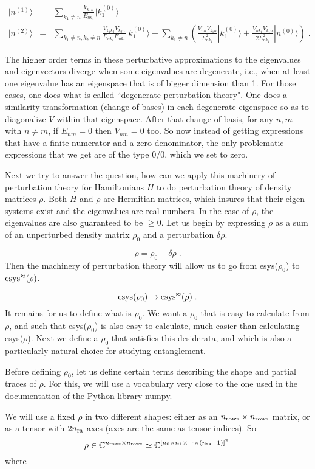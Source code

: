 \documentclass[12pt]{article}%
\newcommand{\ket}[1]{|#1\rangle}
\newcommand{\beq}{\begin{equation}}
\newcommand{\eeq}{\end{equation}}
\newcommand{\beqa}{\begin{eqnarray}}
\newcommand{\eeqa}{\end{eqnarray}}
\newcommand{\rarrow}[0]{\rightarrow}
\newcommand{\CC}[0]{{ \mathbb{C}} }
\newcommand{\nra}[0]{{n_{\rm ra}}}
\newcommand{\nr}[0]{{n_{\rm rows}}}
\begin{document}
\beqa
\ket{n^{(1)}} &=&
\sum_{k_1\neq n} \frac{V_{k_1n}}{E_{nk_1}}\ket{k^{(0)}_1}
\\
\ket{n^{(2)}}&=&
\sum_{k_1\neq n, k_2\neq n}
\frac{V_{k_1k_2}V_{k_2n}}{E_{nk_1}E_{nk_2}}\ket{k_1^{(0)}}
- \sum_{k_1\neq n}\left(
\frac{V_{nn}V_{k_1n}}{E^2_{nk_1}}\ket{k^{(0)}_1}
+ \frac{V_{nk_1}V_{k_1n}}{2E_{nk_1}^2}\ket{n^{(0)}}
\right)
\;.
\eeqa

The higher order terms in
these perturbative approximations
to the eigenvalues and eigenvectors
diverge
when  some eigenvalues are degenerate,
i.e., when at least one eigenvalue
has an eigenspace that is of bigger
dimension than 1. For those cases,
one does what is called
``degenerate perturbation theory".
One does a similarity transformation
(change of bases) in each degenerate
eigenspace so as to diagonalize $V$
within that eigenspace.
After that change of
basis, for any $n,m$ with $n\neq m$,
if $E_{nm}=0$ then $V_{nm}=0$ too.
So now instead of getting expressions
that have a finite numerator and a zero
denominator, the
only problematic expressions that we get are
of the type 0/0, which we set to zero.


Next we try to answer the question, how
can we apply this machinery of perturbation
theory for Hamiltonians  $H$ to do perturbation
theory of density matrices $\rho$.
Both $H$ and $\rho$ are Hermitian matrices,
which insures that
their eigen systems exist and the eigenvalues are real
numbers. In the case of $\rho$,
the eigenvalues are also guaranteed to be $\geq 0$.
Let us begin by expressing $\rho$
as a sum of an unperturbed density matrix $\rho_0$
and a perturbation $\delta \rho$.

\beq
\rho = \rho_0 + \delta \rho
\;.
\eeq
Then the machinery of perturbation
theory will allow us to go from
esys($\rho_0$) to ${\rm esys^\approx(\rho)}$.

\beq
{\rm esys}(\rho_0) \rarrow {\rm esys^\approx(\rho)}
\;.
\eeq
It remains for us to define what is $\rho_0$.
We want a $\rho_0$ that
is easy to calculate
from $\rho$,
and such that esys($\rho_0$) is also easy to
calculate, much easier
than calculating esys($\rho$).
Next we define
a $\rho_0$ that satisfies this desiderata, and
which is also a particularly natural
choice for studying entanglement.

Before defining $\rho_0$, let us
define certain terms describing
the shape and partial traces of $\rho$.
For this, we will use a vocabulary
very close to the one used in the
documentation of the Python library numpy.

We will use a fixed $\rho$ in two different shapes:
either as an $\nr\times\nr$ matrix,
or as a tensor with $2\nra$ axes (axes are the same as
tensor indices). So
\beq
\rho \in \CC^{\nr\times\nr}
\simeq \CC^{[n_0\times n_1 \times\cdots\times(\nra-1)]^2}
\;
\eeq
where
\end{document}
